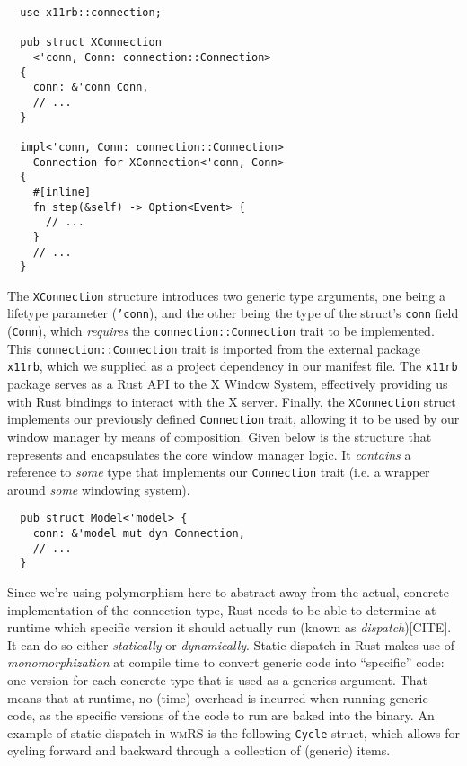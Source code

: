 \begin{verbatim}
  use x11rb::connection;
 
  pub struct XConnection
    <'conn, Conn: connection::Connection>
  {
    conn: &'conn Conn,
    // ...
  }
 
  impl<'conn, Conn: connection::Connection>
    Connection for XConnection<'conn, Conn>
  {
    #[inline]
    fn step(&self) -> Option<Event> {
      // ...
    }
    // ...
  }
\end{verbatim}

The  \texttt{XConnection}  structure  introduces  two  generic  type  arguments,
one  being   a  lifetype  parameter   (\texttt{'conn}),  and  the   other  being
the   type  of   the   struct's  \texttt{conn}   field  (\texttt{Conn}),   which
\textit{requires} the  \texttt{connection::Connection} trait to  be implemented.
This \texttt{connection::Connection} trait is imported from the external package
\texttt{x11rb}, which we supplied as a  project dependency in our manifest file.
The  \texttt{x11rb}  package serves  as  a  Rust API  to  the  X Window  System,
effectively  providing us  with Rust  bindings to  interact with  the X  server.
Finally,  the  \texttt{XConnection}  struct implements  our  previously  defined
\texttt{Connection} trait, allowing it to be used by our window manager by means
of composition.  Given below is  the structure that represents  and encapsulates
the core window manager logic. It \textit{contains} a reference to \textit{some}
type  that  implements our  \texttt{Connection}  trait  (i.e. a  wrapper  around
\textit{some} windowing system).

\begin{verbatim}
  pub struct Model<'model> {
    conn: &'model mut dyn Connection,
    // ...
  }
\end{verbatim}


Since  we're  using  polymorphism  here   to  abstract  away  from  the  actual,
concrete  implementation  of  the  connection   type,  Rust  needs  to  be  able
to  determine  at  runtime  which   specific  version  it  should  actually  run
(known  as \textit{dispatch})[CITE].  It  can do  so either  \textit{statically}
or   \textit{dynamically}.    Static   dispatch    in   Rust   makes    use   of
\textit{monomorphization}  at   compile  time  to  convert   generic  code  into
``specific'' code: one version for each concrete type that is used as a generics
argument.  That means  that  at runtime,  no (time)  overhead  is incurred  when
running generic code, as the specific versions of the code to run are baked into
the binary.  An example  of static  dispatch in  \textsc{wmRS} is  the following
\texttt{Cycle} struct, which  allows for cycling forward and  backward through a
collection of (generic) items.

